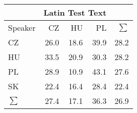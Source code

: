 \begin{tabular}{l|rrr|r}
\hline
 & \multicolumn{3}{c}{Latin Test Text} & \\
\hline
 Speaker   &   CZ &   HU &   PL &   $\sum$ \\
\hline
 CZ        & 26.0 & 18.6 & 39.9 &     28.2 \\
 HU        & 33.5 & 20.9 & 30.3 &     28.2 \\
 PL        & 28.9 & 10.9 & 43.1 &     27.6 \\
 SK        & 22.4 & 16.4 & 28.4 &     22.4 \\
\hline
 $\sum$   & 27.4 & 17.1 & 36.3 &     26.9 \\
\hline
\end{tabular}